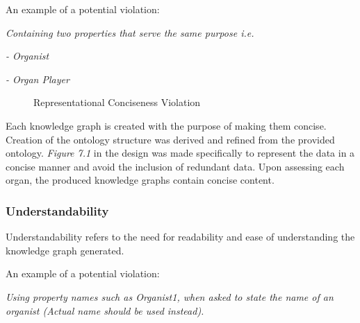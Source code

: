 \noindent An example of a potential violation: 
\vspace{-0.1cm}
\begin{displayquote}
    \textit{Containing two properties that serve the same purpose i.e.}
\end{displayquote}
\vspace{-0.5cm}
\begin{displayquote}
    \textit{- Organist}
\end{displayquote}
\vspace{-0.6cm}
\begin{displayquote}
    \textit{- Organ Player}
\end{displayquote}

\begin{figure}[H]
\begin{center}
\end{center}
\vspace{-0.5cm}
\caption{Representational Conciseness Violation}
\end{figure}

Each knowledge graph is created with the purpose of making them concise. Creation of the ontology structure was derived and refined from the provided ontology. \textit{Figure 7.1} in the design was made specifically to represent the data in a concise manner and avoid the inclusion of redundant data. Upon assessing each organ, the produced knowledge graphs contain concise content.

\subsubsection{Understandability}
\hspace{0.5cm} Understandability refers to the need for readability and ease of understanding the knowledge graph generated. \cite{knowledgegraphevaulationbook}

\noindent An example of a potential violation: 
\vspace{-0.1cm}
\begin{displayquote}
    \textit{Using property names such as Organist1, when asked to state the name of an organist (Actual name should be used instead).}
\end{displayquote}

